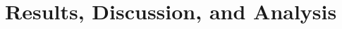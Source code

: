 \documentclass{article}
\begin{document}




\section{Results, Discussion, and Analysis} \label{results}
\end{document}
